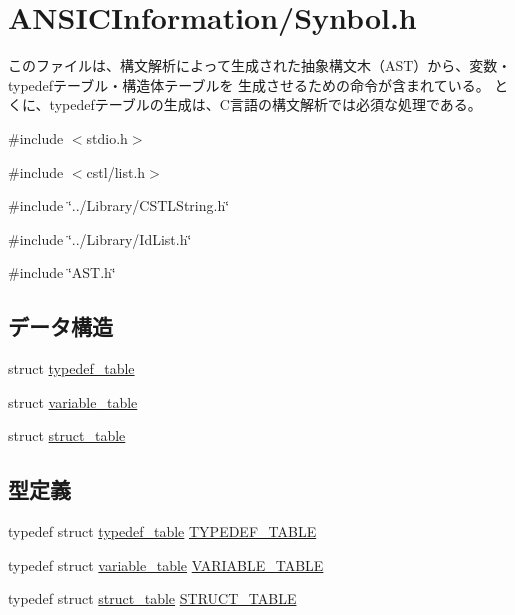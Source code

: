 \section{ANSICInformation/Synbol.h}
\label{Synbol_8h}


このファイルは、構文解析によって生成された抽象構文木（AST）から、変数・typedefテーブル・構造体テーブルを 生成させるための命令が含まれている。 とくに、typedefテーブルの生成は、C言語の構文解析では必須な処理である。  


{\ttfamily \#include $<$stdio.h$>$}\par
{\ttfamily \#include $<$cstl/list.h$>$}\par
{\ttfamily \#include \char`\"{}../Library/CSTLString.h\char`\"{}}\par
{\ttfamily \#include \char`\"{}../Library/IdList.h\char`\"{}}\par
{\ttfamily \#include \char`\"{}AST.h\char`\"{}}\par
\subsection*{データ構造}
\begin{DoxyCompactItemize}
\item 
struct \hyperlink{structtypedef__table}{typedef\_\-table}
\item 
struct \hyperlink{structvariable__table}{variable\_\-table}
\item 
struct \hyperlink{structstruct__table}{struct\_\-table}
\end{DoxyCompactItemize}
\subsection*{型定義}
\begin{DoxyCompactItemize}
\item 
typedef struct \hyperlink{structtypedef__table}{typedef\_\-table} \hyperlink{Synbol_8h_acea964af3672f8ac88991ff14c52694a}{TYPEDEF\_\-TABLE}
\item 
typedef struct \hyperlink{structvariable__table}{variable\_\-table} \hyperlink{Synbol_8h_aba95a019bb71ccd5e3e128174d299272}{VARIABLE\_\-TABLE}
\item 
typedef struct \hyperlink{structstruct__table}{struct\_\-table} \hyperlink{Synbol_8h_af5018610fe25e6d5a5a8bbe35d944ec5}{STRUCT\_\-TABLE}
\end{DoxyCompactItemize}
